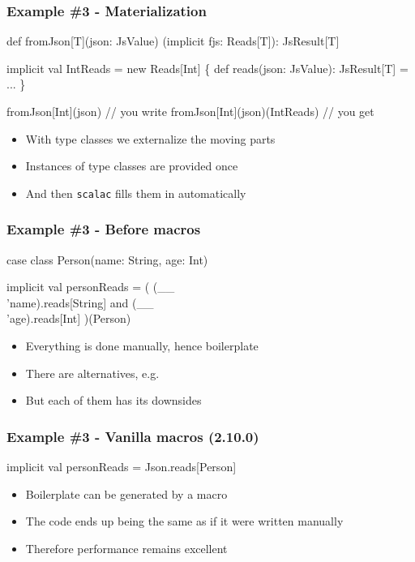 \documentclass[svgnames,hyperref={bookmarks=false}]{beamer}
\begin{document}
\begin{frame}[fragile]
\frametitle{Example \#3 - Materialization}

\begin{semiverbatim}
def fromJson[T](json: JsValue)
  (implicit fjs: Reads[T]): JsResult[T]

implicit val IntReads = new Reads[Int] \{
  def reads(json: JsValue): JsResult[T] = ...
\}

fromJson[Int](json) // you write
fromJson[Int](json)(IntReads) // you get

\end{semiverbatim}

\begin{itemize}
\item With type classes we externalize the moving parts
\item Instances of type classes are provided once
\item And then \texttt{scalac} fills them in automatically
\end{itemize}
\end{frame}

\begin{frame}[fragile]
\frametitle{Example \#3 - Before macros}

\begin{semiverbatim}
case class Person(name: String, age: Int)

implicit val personReads = (
  (__ \\ 'name).reads[String] and
  (__ \\ 'age).reads[Int]
)(Person)

\end{semiverbatim}

\begin{itemize}
\item Everything is done manually, hence boilerplate
\item There are alternatives, e.g. 
\item But each of them has its downsides
\end{itemize}
\end{frame}

\begin{frame}[fragile]
\frametitle{Example \#3 - Vanilla macros (2.10.0)}

\begin{semiverbatim}
implicit val personReads = Json\alert{.reads[}Person\alert{]}

\end{semiverbatim}

\begin{itemize}
\item Boilerplate can be generated by a macro
\item The code ends up being the same as if it were written manually
\item Therefore performance remains excellent
\end{itemize}
\end{frame}
\end{document}

